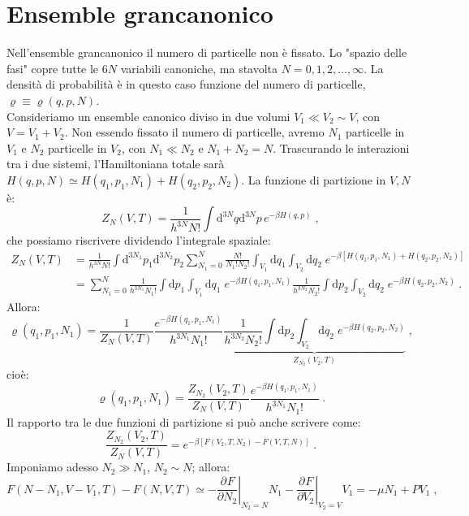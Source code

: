 \documentclass[10pt,a4paper]{report}
\theoremstyle{definition}
\newcommand{\pdev}[3][]{\frac{\partial^{#1} #2}{\partial #3^{#1}}}
\numberwithin{equation}{section}
\newcommand{\diff}[1][]{\mathrm{d}#1}
\begin{document}
\section{Ensemble grancanonico}
Nell'ensemble grancanonico il numero di particelle non è fissato. Lo "spazio delle fasi" copre tutte le $6N$ variabili canoniche, ma stavolta $N=0,1,2,\ldots,\infty$. La densità di probabilità è in questo caso funzione del numero di particelle, $\varrho\equiv \varrho(q,p,N)$. \\
Consideriamo un ensemble canonico diviso in due volumi $V_1\ll V_2\sim V$, con $V=V_1+V_2$. Non essendo fissato il numero di particelle, avremo $N_1$ particelle in $V_1$ e $N_2$ particelle in $V_2$, con $N_1\ll N_2$ e $N_1+N_2=N$. Trascurando le interazioni tra i due sistemi, l'Hamiltoniana totale sarà $H(q,p,N)\simeq H(q_1,p_1,N_1)+H(q_2,p_2,N_2)$. La funzione di partizione in $V,N$ è:
\begin{equation}
Z_N(V,T)=\frac{1}{h^{3N}N!}\int\diff^{3N}{q}\diff^{3N}{p}\,e^{-\beta H(q,p)}\;,
\end{equation}
che possiamo riscrivere dividendo l'integrale spaziale:
\begin{align*}
Z_N(V,T)&= \frac{1}{h^{3N}N!}\int\diff^{3N_1}{p_1}\diff^{3N_2}{p_2}\sum_{N_1=0}^N\frac{N!}{N_1!N_2!}\int_{V_1}\diff{q_1}\int_{V_2}\diff{q_2}\;e^{-\beta[H(q_1,p_1,N_1)+H(q_2,p_2,N_2)]} \\
&= \sum_{N_1=0}^N\frac{1}{h^{3N_1}N_1!}\int\diff{p_1}\int_{V_1}\diff{q_1}\; e^{-\beta H(q_1,p_1,N_1)}\frac{1}{h^{3N_2}N_2!}\int\diff{p_2}\int_{V_2}\diff{q_2}\;e^{-\beta H(q_2,p_2,N_2)}\;.
\end{align*}
Allora:
$$
\varrho(q_1,p_1,N_1)=\frac{1}{Z_N(V,T)}\frac{e^{-\beta H(q_1,p_1,N_1)}}{h^{3N_1}N_1!}\underbrace{\frac{1}{h^{3N_2}N_2!}\int\diff{p_2}\int_{V_2}\diff{q_2}\; e^{-\beta H(q_2,p_2,N_2)}}_{Z_{N_2}(V_2,T)}\;,
$$
cioè:
\begin{equation}
\varrho(q_1,p_1,N_1)=\frac{Z_{N_2}(V_2,T)}{Z_N(V,T)}\frac{e^{-\beta H(q_1,p_1,N_1)}}{h^{3N_1}N_1!}\;.
\end{equation}
Il rapporto tra le due funzioni di partizione si può anche scrivere come:
\begin{equation}
\frac{Z_{N_2}(V_2,T)}{Z_N(V,T)}=e^{-\beta[F(V_2,T,N_2)-F(V,T,N)]}\;.
\end{equation}
Imponiamo adesso $N_2\gg N_1$, $N_2\sim N$; allora:
\begin{equation}
F(N-N_1,V-V_1,T)-F(N,V,T)\simeq -\left.\pdev{F}{N_2}\right|_{N_2=N}N_1-\left.\pdev{F}{V_2}\right|_{V_2=V}V_1=-\mu N_1+PV_1\;,
\end{equation}
\end{document}
